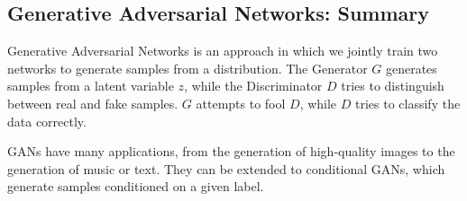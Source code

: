 \subsection*{Generative Adversarial Networks: Summary}
Generative Adversarial Networks is an approach in which we jointly train two networks to generate samples from a distribution. The Generator $G$ generates samples from a latent variable $z$, while the Discriminator $D$ tries to distinguish between real and fake samples. $G$ attempts to fool $D$, while $D$ tries to classify the data correctly.

GANs have many applications, from the generation of high-quality images to the generation of music or text. They can be extended to conditional GANs, which generate samples conditioned on a given label.

\newpage